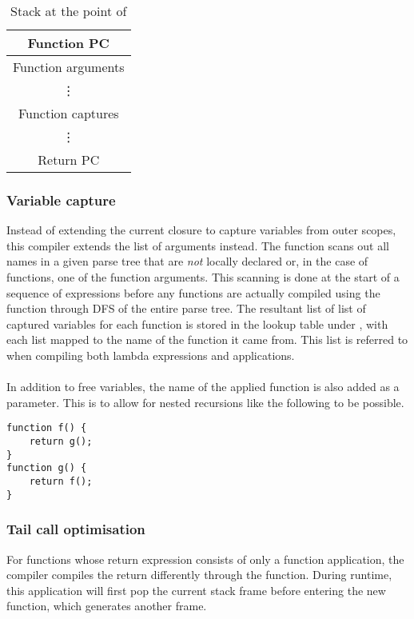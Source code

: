 \begin{table}[!h]
\begin{center}
\begin{tabular}{ |c| } 
 \hline
 Function PC \\
 \hline
 Function arguments \\
 \vdots \\
 \hline
 Function captures \\
 \vdots \\
 \hline
 Return PC \\
 \hline
\end{tabular}
\caption*{Stack at the point of }
\end{center}
\end{table}
\subsubsection{Variable capture}
Instead of extending the current closure to capture variables from outer scopes, this compiler extends the list of arguments instead. The function  scans out all names in a given parse tree that are \textit{not} locally declared or, in the case of functions, one of the function arguments. This scanning is done at the start of a sequence of expressions before any functions are actually compiled using the  function through DFS of the entire parse tree. The resultant list of list of captured variables for each function is stored in the lookup table under , with each list mapped to the name of the function it came from. This list is referred to when compiling both lambda expressions and applications.\\\\
In addition to free variables, the name of the applied function is also added as a parameter. This is to allow for nested recursions like the following to be possible. 
\begin{center}
\begin{verbatim}
function f() {
    return g();
}
function g() {
    return f();
}
\end{verbatim}
\end{center}

\subsubsection{Tail call optimisation}
For functions whose return expression consists of only a function application, the compiler compiles the return differently through the  function. During runtime, this application will first pop the current stack frame before entering the new function, which generates another frame. 


